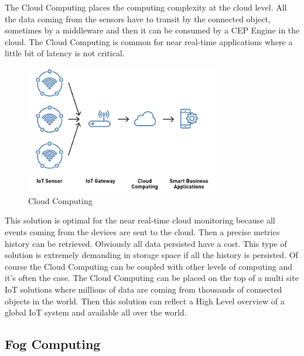 \documentclass[11pt]{article}
\begin{document}
The Cloud Computing places the computing complexity at the cloud level. All the data coming from the sensors have to transit by the connected object, sometimes by a middleware and then it can be consumed by a CEP Engine in the cloud. The Cloud Computing is common for near real-time applications where a little bit of latency is not critical.
\newline
\begin{figure}[h]
	\includegraphics[width=\textwidth,height=160pt]{assets/Cloud_Computing.png}
	\caption{Cloud Computing}
	\label{fig:Cloud-Computing}
\end{figure}

This solution is optimal for the near real-time cloud monitoring because all events coming from the devices are sent to the cloud. Then a precise metrics history can be retrieved. Obviously all data persisted have a cost. This type of solution is extremely demanding in storage space if all the history is persisted.
\newline
\newline
Of course the Cloud Computing can be coupled with other levels of computing and it's often the case. The Cloud Computing can be placed on the top of a multi site IoT solutions where millions of data are coming from thousands of connected objects in the world. Then this solution can reflect a High Level overview of a global IoT system and available all over the world.


\subsection{Fog Computing}
\end{document}
